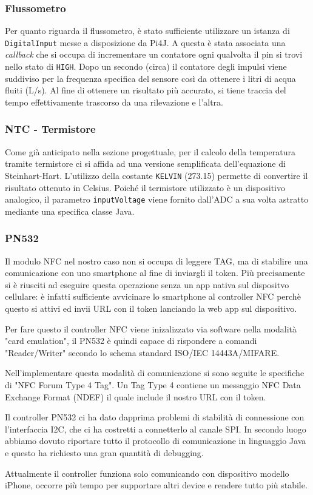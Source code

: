 \subsubsection{Flussometro}
Per quanto riguarda il flussometro, è stato sufficiente utilizzare un istanza di \texttt{DigitalInput} messe a disposizione da Pi4J. A questa è stata associata una \textit{callback} che si occupa di incrementare un contatore ogni qualvolta il pin si trovi nello stato di \texttt{HIGH}. Dopo un secondo (circa) il contatore degli impulsi viene suddiviso per la frequenza specifica del sensore così da ottenere i litri di acqua fluiti (L/s). Al fine di ottenere un risultato più accurato, si tiene traccia del tempo effettivamente trascorso da una rilevazione e l'altra.

%
\subsubsection{NTC - Termistore}
Come già anticipato nella sezione progettuale, per il calcolo della temperatura tramite termistore ci si affida ad una versione semplificata dell'equazione di Steinhart-Hart. L'utilizzo della costante \texttt{KELVIN} (273.15) permette di convertire il risultato ottenuto in Celsius. Poiché il termistore utilizzato è un dispositivo analogico, il parametro \texttt{inputVoltage} viene fornito dall'ADC a sua volta astratto mediante una specifica classe Java.

% 
\subsubsection{PN532}

Il modulo NFC nel nostro caso non si occupa di leggere TAG, ma di stabilire una comunicazione con uno smartphone al fine di inviargli il token.
Più precisamente si è riusciti ad eseguire questa operazione senza un app nativa sul dispositvo cellulare: 
è infatti sufficiente avvicinare lo smartphone al controller NFC perchè questo si attivi ed invii URL con il token lanciando la web app sul dispositivo.

Per fare questo il controller NFC viene inizalizzato via software nella modalità "card emulation", il PN532 è quindi capace di rispondere a comandi "Reader/Writer" 
secondo lo schema standard ISO/IEC 14443A/MIFARE.

Nell'implementare questa modalità di comunicazione si sono seguite le specifiche di "NFC Forum Type 4 Tag".
Un Tag Type 4 contiene un messaggio NFC Data Exchange Format (NDEF) il quale include il nostro URL con il token.

Il controller PN532 ci ha dato dapprima problemi di stabilità di connessione con l'interfaccia I2C, che ci ha costretti a connetterlo al canale SPI.
In secondo luogo abbiamo dovuto riportare tutto il protocollo di comunicazione in linguaggio Java e questo ha richiesto una gran quantità di debugging.

Attualmente il controller funziona solo comunicando con dispositivo modello iPhone, occorre più tempo per supportare altri device e rendere tutto più stabile. 

\newpage
